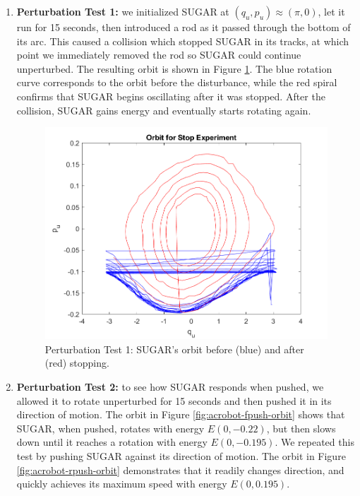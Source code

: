 \documentclass[journal,twoside,web]{ieeecolor}
\begin{document}
{\begin{enumerate}
\item \textbf{Perturbation Test 1:}
    we initialized SUGAR at 
    \((q_u,p_u) \approx \left(\pi,0\right)\), let it run for 15
    seconds, then introduced a rod as it passed through the bottom of
    its arc.
    This caused a collision which stopped SUGAR in its tracks, at which
    point we immediately removed the rod so SUGAR could continue
    unperturbed.
    The resulting orbit is shown in Figure \ref{fig:acrobot-stopped-orbit}.
    The blue rotation curve corresponds to the orbit before the disturbance,
    while the red spiral confirms that SUGAR begins oscillating after it
    was stopped.  
    After the collision, SUGAR gains energy and eventually starts
    rotating again.

\begin{figure}
    \centering
    \includegraphics[width=0.8\linewidth]{acrobot_stopped_orbit.png}
    \caption{Perturbation Test 1: SUGAR's orbit before (blue) and after (red) stopping.}
    \label{fig:acrobot-stopped-orbit}
\end{figure}


\item \textbf{Perturbation Test 2:}
    to see how SUGAR responds when pushed, we allowed
    it to rotate unperturbed for 15 seconds and then pushed it in its
    direction of motion.
    The orbit in Figure \ref{fig:acrobot-fpush-orbit} shows that SUGAR,
    when pushed, rotates with energy \(E(0,-0.22)\), but then slows down until
    it reaches a rotation with energy \(E(0,-0.195)\).
    We repeated this test by pushing SUGAR against its direction of motion.
    The orbit in Figure \ref{fig:acrobot-rpush-orbit} demonstrates that it
    readily changes direction, and quickly achieves its maximum speed
    with energy \(E(0,0.195)\).
\end{enumerate}

}
\end{document}
